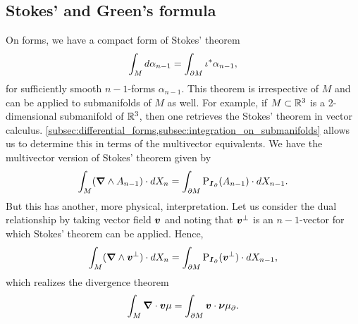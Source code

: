 


\subsection{Stokes' and Green's formula}
On forms, we have a compact form of Stokes' theorem
\begin{equation}
\int_M d \alpha_{n-1} = \int_{{\partial M}} \iota^* \alpha_{n-1},
\end{equation}
for sufficiently smooth $n-1$-forms $\alpha_{n-1}$. This theorem is irrespective of $M$ and can be applied to submanifolds of $M$ as well. For example, if $M\subset \mathbb{R}^3$ is a 2-dimensional submanifold of $\mathbb{R}^3$, then one retrieves the Stokes' theorem in vector calculus. \cref{subsec:differential_forms,subsec:integration_on_submanifolds} allows us to determine this in terms of the multivector equivalents. We have the multivector version of Stokes' theorem given by
\begin{equation}
\label{eq:stokes_theorem}
\int_M (\boldsymbol{\nabla} \wedge A_{n-1})\cdot dX_n = \int_{\partial M} \operatorname{P}_{\boldsymbol{I}_\partial}(A_{n-1}) \cdot dX_{n-1}.
\end{equation}
But this has another, more physical, interpretation. Let us consider the dual relationship by taking vector field $\boldsymbol{v}$ and noting that $\boldsymbol{v}^\perp$ is an $n-1$-vector for which Stokes' theorem can be applied. Hence,
\begin{equation}
\label{eq:stokes_theorem_dual}
\int_M (\boldsymbol{\nabla} \wedge \boldsymbol{v}^\perp) \cdot dX_n = \int_{\partial M} \operatorname{P}_{\boldsymbol{I}_\partial}(\boldsymbol{v}^\perp) \cdot dX_{n-1},
\end{equation}
which realizes the divergence theorem
\begin{equation}
\int_M \boldsymbol{\nabla} \cdot \boldsymbol{v} \mu = \int_{\partial M} \boldsymbol{v}\cdot \boldsymbol{\nu} \mu_\partial.
\end{equation}

